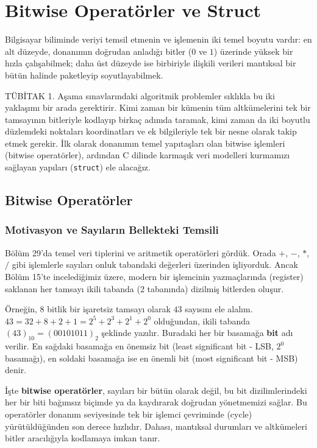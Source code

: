 \chapter[Bitwise Operatörler ve Struct · \textit{Orta}]{Bitwise Operatörler ve Struct}

Bilgisayar biliminde veriyi temsil etmenin ve işlemenin iki temel boyutu vardır: en alt düzeyde, donanımın doğrudan anladığı bitler ($0$ ve $1$) üzerinde yüksek bir hızla çalışabilmek; daha üst düzeyde ise birbiriyle ilişkili verileri mantıksal bir bütün halinde paketleyip soyutlayabilmek.

TÜBİTAK 1. Aşama sınavlarındaki algoritmik problemler sıklıkla bu iki yaklaşımı bir arada gerektirir. Kimi zaman bir kümenin tüm altkümelerini tek bir tamsayının bitleriyle kodlayıp birkaç adımda taramak, kimi zaman da iki boyutlu düzlemdeki noktaları koordinatları ve ek bilgileriyle tek bir nesne olarak takip etmek gerekir. İlk olarak donanımın temel yapıtaşları olan bitwise işlemleri (bitwise operatörler), ardından C dilinde karmaşık veri modelleri kurmamızı sağlayan yapıları (\lstinline|struct|) ele alacağız.

\section{Bitwise Operatörler}

\subsection{Motivasyon ve Sayıların Bellekteki Temsili}

Bölüm 29'da temel veri tiplerini ve aritmetik operatörleri gördük. Orada $+$, $-$, $*$, $/$ gibi işlemlerle sayıları onluk tabandaki değerleri üzerinden işliyorduk. Ancak Bölüm 15'te incelediğimiz üzere, modern bir işlemcinin yazmaçlarında (register) saklanan her tamsayı ikili tabanda (2 tabanında) dizilmiş bitlerden oluşur. 

Örneğin, 8 bitlik bir işaretsiz tamsayı olarak $43$ sayısını ele alalım. $43 = 32 + 8 + 2 + 1 = 2^5 + 2^3 + 2^1 + 2^0$ olduğundan, ikili tabanda $(43)_{10} = (00101011)_2$ şeklinde yazılır. Buradaki her bir basamağa \textbf{bit} adı verilir. En sağdaki basamağa en önemsiz bit (least significant bit - LSB, $2^0$ basamağı), en soldaki basamağa ise en önemli bit (most significant bit - MSB) denir.

İşte \textbf{bitwise operatörler}, sayıları bir bütün olarak değil, bu bit dizilimlerindeki her bir biti bağımsız biçimde ya da kaydırarak doğrudan yönetmemizi sağlar. Bu operatörler donanım seviyesinde tek bir işlemci çevriminde (cycle) yürütüldüğünden son derece hızlıdır. Dahası, mantıksal durumları ve altkümeleri bitler aracılığıyla kodlamaya imkan tanır.


